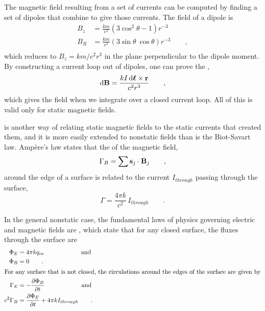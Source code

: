 	The magnetic field resulting from a set of currents can be
	computed by finding a set of dipoles that combine to give
	those currents. The field of a dipole is
	\begin{align*}
		B_z	&= \frac{km}{c^2}\left(3\cos^2\theta-1\right)r^{-3}\\
		B_R	&= \frac{km}{c^2}\left(3\sin\theta\:\cos\theta\right)r^{-3} \qquad ,\\
	\end{align*}
	which reduces to $B_z=km/c^2r^3$ in the plane perpendicular to the
	dipole moment. By constructing a current loop out of dipoles, 
	one can prove the ,
	\begin{equation*}
	  \operatorname{d\!} \mathbf{B} = \frac{kI\operatorname{d\!} \boldsymbol{\ell}\times\mathbf{r}}{c^2r^3} \qquad ,
	\end{equation*}
	which gives the field when we integrate over a closed current loop.
	All of this is valid only for static magnetic fields.
	
	 is another way of relating static magnetic fields to the static currents
	that created them, and it is more easily extended to nonstatic fields than is the
	Biot-Savart law. Amp\`{e}re's law states that the  of the magnetic
	field,
	\begin{equation*}
		\Gamma_B = \sum \mathbf{s}_j\cdot\mathbf{B}_j \qquad ,
	\end{equation*}
	around the edge of a surface is related to the current $I_{through}$ passing through
	the surface,
	\begin{equation*}
		\Gamma = \frac{4\pi k}{c^2}\,I_{through} \qquad .
	\end{equation*}

	In the general nonstatic case, the fundamental laws of physics governing
	electric and magnetic fields are , which state that
	for any closed surface, the fluxes through the surface are
	\begin{align*}
		\Phi_E		&= 4\pi kq_{in} \qquad\qquad\qquad \text{and}\\
		\Phi_B		&= 0 \qquad .\\
	\intertext{For any surface that is not closed, the circulations 
	around the edges of the surface are given by}
		\Gamma_E 	&= -\frac{\partial\Phi_B}{\partial t}  \qquad\qquad\qquad \text{and} \\
		c^2\Gamma_B 	&= \frac{\partial\Phi_E}{\partial t}  + 4\pi k I_{through} \qquad .
	\end{align*}

